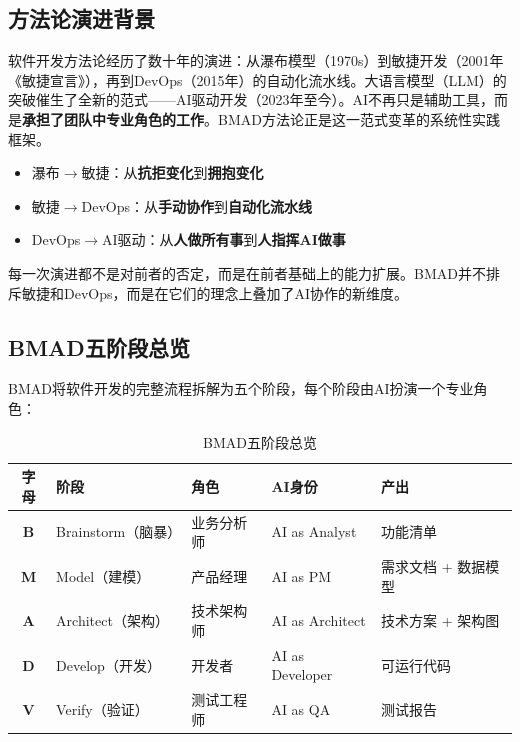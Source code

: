 \subsection{方法论演进背景}

软件开发方法论经历了数十年的演进：从瀑布模型（1970s）到敏捷开发（2001年《敏捷宣言》），再到DevOps（2015年）的自动化流水线。大语言模型（LLM）的突破催生了全新的范式——AI驱动开发（2023年至今）。AI不再只是辅助工具，而是\textbf{承担了团队中专业角色的工作}。BMAD方法论正是这一范式变革的系统性实践框架。

\begin{theorybox}[方法论演进的核心逻辑]
\begin{itemize}[leftmargin=2em]
  \item 瀑布$\to$敏捷：从\textbf{抗拒变化}到\textbf{拥抱变化}
  \item 敏捷$\to$DevOps：从\textbf{手动协作}到\textbf{自动化流水线}
  \item DevOps$\to$AI驱动：从\textbf{人做所有事}到\textbf{人指挥AI做事}
\end{itemize}
每一次演进都不是对前者的否定，而是在前者基础上的能力扩展。BMAD并不排斥敏捷和DevOps，而是在它们的理念上叠加了AI协作的新维度。
\end{theorybox}

\subsection{BMAD五阶段总览}

BMAD将软件开发的完整流程拆解为五个阶段，每个阶段由AI扮演一个专业角色：

\begin{table}[H]
\centering
\begin{tabular}{cllll}
\toprule
\textbf{字母} & \textbf{阶段} & \textbf{角色} & \textbf{AI身份} & \textbf{产出} \\
\midrule
\textbf{B} & Brainstorm（脑暴） & 业务分析师 & AI as Analyst & 功能清单 \\
\textbf{M} & Model（建模） & 产品经理 & AI as PM & 需求文档 + 数据模型 \\
\textbf{A} & Architect（架构） & 技术架构师 & AI as Architect & 技术方案 + 架构图 \\
\textbf{D} & Develop（开发） & 开发者 & AI as Developer & 可运行代码 \\
\textbf{V} & Verify（验证） & 测试工程师 & AI as QA & 测试报告 \\
\bottomrule
\end{tabular}
\caption{BMAD五阶段总览}
\end{table}

